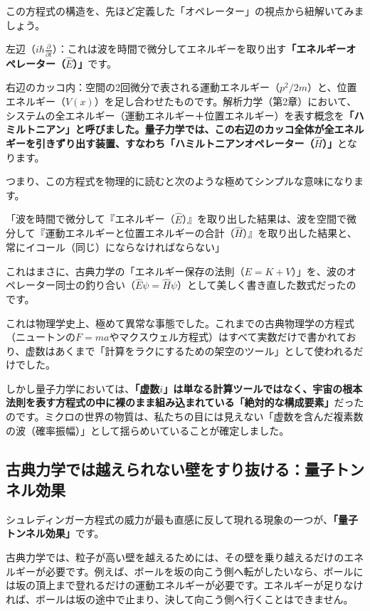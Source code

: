 この方程式の構造を、先ほど定義した「オペレーター」の視点から紐解いてみましょう。

左辺（\(i\hbar \frac{\partial}{\partial t}\)）：これは波を時間で微分してエネルギーを取り出す\textbf{「エネルギーオペレーター（\(\hat{E}\)）」}です。

右辺のカッコ内：空間の2回微分で表される運動エネルギー（\(p^2/2m\)）と、位置エネルギー（\(V(x)\)）を足し合わせたものです。解析力学（第2章）において、システムの全エネルギー（運動エネルギー＋位置エネルギー）を表す概念を\textbf{「ハミルトニアン」と呼びました。量子力学では、この右辺のカッコ全体が全エネルギーを引きずり出す装置、すなわち「ハミルトニアンオペレーター（\(\hat{H}\)）」}となります。

つまり、この方程式を物理的に読むと次のような極めてシンプルな意味になります。

「波を時間で微分して『エネルギー（\(\hat{E}\)）』を取り出した結果は、波を空間で微分して『運動エネルギーと位置エネルギーの合計（\(\hat{H}\)）』を取り出した結果と、常にイコール（同じ）にならなければならない」

これはまさに、古典力学の「エネルギー保存の法則（\(E = K + V\)）」を、波のオペレーター同士の釣り合い（\(\hat{E}\psi = \hat{H}\psi\)）として美しく書き直した数式だったのです。

これは物理学史上、極めて異常な事態でした。これまでの古典物理学の方程式（ニュートンの\(F=ma\)やマクスウェル方程式）はすべて実数だけで書かれており、虚数はあくまで「計算をラクにするための架空のツール」として使われるだけでした。

しかし量子力学においては、\textbf{「虚数\(i\)」は単なる計算ツールではなく、宇宙の根本法則を表す方程式の中に裸のまま組み込まれている「絶対的な構成要素」}だったのです。ミクロの世界の物質は、私たちの目には見えない「虚数を含んだ複素数の波（確率振幅）」として揺らめいていることが確定しました。


\subsection{古典力学では越えられない壁をすり抜ける：量子トンネル効果}

シュレディンガー方程式の威力が最も直感に反して現れる現象の一つが、\textbf{「量子トンネル効果」}です。

古典力学では、粒子が高い壁を越えるためには、その壁を乗り越えるだけのエネルギーが必要です。例えば、ボールを坂の向こう側へ転がしたいなら、ボールには坂の頂上まで登れるだけの運動エネルギーが必要です。エネルギーが足りなければ、ボールは坂の途中で止まり、決して向こう側へ行くことはできません。

